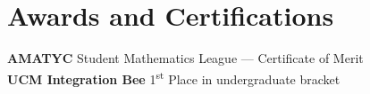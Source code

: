 \documentclass[./Resume.tex]{subfiles}
\begin{document}
\section{Awards and Certifications}
    {\bfseries AMATYC} Student Mathematics League --- Certificate of Merit\\
    {\bfseries UCM Integration Bee} 1\textsuperscript{st} Place in undergraduate bracket
\end{document}
